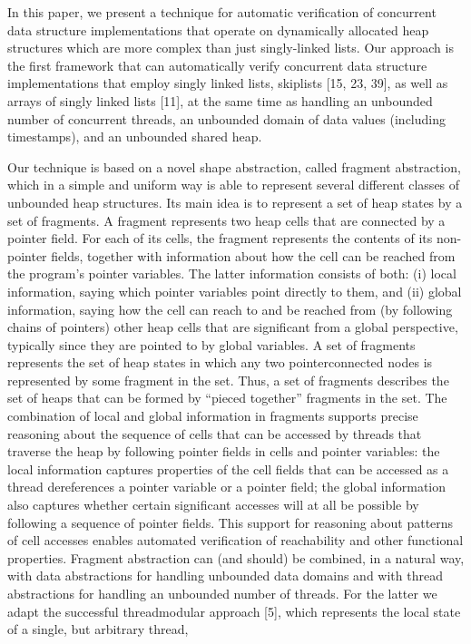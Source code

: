 In this paper, we present a technique for automatic verification of concurrent data structure implementations that operate on dynamically allocated heap structures which are more complex than just singly-linked lists. Our approach is the first
framework that can automatically verify concurrent data structure implementations that
employ singly linked lists, skiplists [15, 23, 39], as well as arrays of singly linked
lists [11], at the same time as handling an unbounded number of concurrent threads,
an unbounded domain of data values (including timestamps), and an unbounded shared
heap.

Our technique is based on a novel shape abstraction, called fragment abstraction,
which in a simple and uniform way is able to represent several different classes of
unbounded heap structures. Its main idea is to represent a set of heap states by a set
of fragments. A fragment represents two heap cells that are connected by a pointer
field. For each of its cells, the fragment represents the contents of its non-pointer fields,
together with information about how the cell can be reached from the program’s pointer
variables. The latter information consists of both: (i) local information, saying which
pointer variables point directly to them, and (ii) global information, saying how the cell
can reach to and be reached from (by following chains of pointers) other heap cells that
are significant from a global perspective, typically since they are pointed to by global
variables. A set of fragments represents the set of heap states in which any two pointerconnected nodes is represented by some fragment in the set. Thus, a set of fragments
describes the set of heaps that can be formed by “pieced together” fragments in the
set. The combination of local and global information in fragments supports precise
reasoning about the sequence of cells that can be accessed by threads that traverse the
heap by following pointer fields in cells and pointer variables: the local information
captures properties of the cell fields that can be accessed as a thread dereferences a
pointer variable or a pointer field; the global information also captures whether certain
significant accesses will at all be possible by following a sequence of pointer fields. This
support for reasoning about patterns of cell accesses enables automated verification of
reachability and other functional properties.
Fragment abstraction can (and should) be combined, in a natural way, with data abstractions for handling unbounded data domains and with thread abstractions for handling an unbounded number of threads. For the latter we adapt the successful threadmodular approach [5], which represents the local state of a single, but arbitrary thread,
